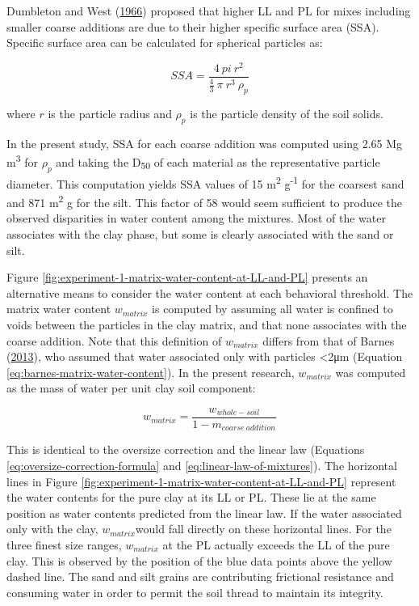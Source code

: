 \documentclass[
  letterpaper,
]{article}
\begin{document}
Dumbleton and West (\protect\hyperlink{ref-Dumbleton1966b}{1966}) proposed that higher LL and PL for mixes including smaller coarse additions are due to their higher specific surface area (SSA).
Specific surface area can be calculated for spherical particles as:

\begin{equation}
SSA = \frac{4~pi~r^2} {\frac{4}{3} ~ \pi ~ r^3 ~ \rho_p}
\label{eq:specific-surface-area}
\end{equation}

where \(r\) is the particle radius and \(\rho_p\) is the particle density of the soil solids.

In the present study, SSA for each coarse addition was computed using 2.65 Mg m\textsuperscript{3} for \(\rho_p\) and taking the D\textsubscript{50} of each material as the representative particle diameter.
This computation yields SSA values of 15 m\textsuperscript{2} g\textsuperscript{-1} for the coarsest sand and 871 m\textsuperscript{2} g for the silt.
This factor of 58 would seem sufficient to produce the observed disparities in water content among the mixtures.
Most of the water associates with the clay phase, but some is clearly associated with the sand or silt.

Figure \ref{fig:experiment-1-matrix-water-content-at-LL-and-PL} presents an alternative means to consider the water content at each behavioral threshold.
The matrix water content \(w_{matrix}\) is computed by assuming all water is confined to voids between the particles in the clay matrix, and that none associates with the coarse addition.
Note that this definition of \(w_{matrix}\) differs from that of Barnes (\protect\hyperlink{ref-Barnes2013}{2013}), who assumed that water associated only with particles \textless2μm (Equation \eqref{eq:barnes-matrix-water-content}).
In the present research, \(w_{matrix}\) was computed as the mass of water per unit clay soil component:

\begin{equation}
w_{matrix} = \frac{w_{whole-soil}}{1 - m_{coarse~addition}}
\label{eq:my-matrix-water-content}
\end{equation}

This is identical to the oversize correction and the linear law (Equations \eqref{eq:oversize-correction-formula} and \eqref{eq:linear-law-of-mixtures}).
The horizontal lines in Figure \ref{fig:experiment-1-matrix-water-content-at-LL-and-PL} represent the water contents for the pure clay at its LL or PL.
These lie at the same position as water contents predicted from the linear law.
If the water associated only with the clay, \(w_{matrix}\)would fall directly on these horizontal lines.
For the three finest size ranges, \(w_{matrix}\) at the PL actually exceeds the LL of the pure clay.
This is observed by the position of the blue data points above the yellow dashed line.
The sand and silt grains are contributing frictional resistance and consuming water in order to permit the soil thread to maintain its integrity.
\end{document}
